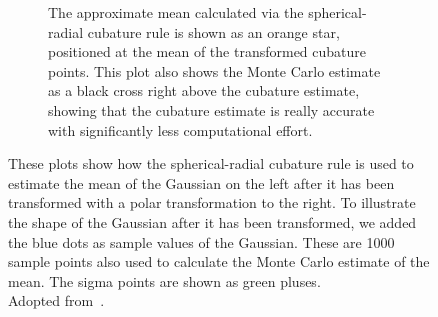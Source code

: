 \begin{figure}
\begin{subfigure}[t]{0.5\linewidth}
			\caption{The approximate mean calculated via the spherical-radial cubature rule is shown as an orange star, positioned at the mean of the transformed cubature points. This plot also shows the Monte Carlo estimate as a black cross right above the cubature estimate, showing that the cubature estimate is really accurate with significantly less computational effort.}
		\end{subfigure}
		\caption{These plots show how the spherical-radial cubature rule is used to estimate the mean of the Gaussian on the left after it has been transformed with a polar transformation to the right. To illustrate the shape of the Gaussian after it has been transformed, we added the blue dots as sample values of the Gaussian. These are 1000 sample points also used to calculate the Monte Carlo estimate of the mean. The sigma points are shown as green pluses. \\ Adopted from~\cite{solinCubatureIntegrationMethods2010}.}
		\label{fig:cubature}
	\end{figure}

